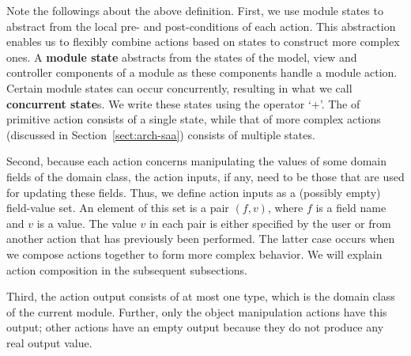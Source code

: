 Note the followings about the above definition. 
First, we use module states to abstract from the local pre- and post-conditions of each action. This abstraction enables us to flexibly combine actions based on states to construct more complex ones. A \textbf{module state} abstracts from the states of the model, view and controller components of a module as these components handle a module action. Certain module states can occur concurrently, resulting in what we call \textbf{concurrent state}s. We write these states using the operator `+'. 
The  of primitive action consists of a single state, while that of more complex actions (discussed in Section~\ref{sect:arch-saa}) consists of multiple states.

Second, because each action concerns manipulating the values of some domain fields of the domain class, the action inputs, if any, need to be those that are used for updating these fields. Thus, we define action inputs as a (possibly empty) field-value set. An element of this set is a pair $(f,v)$, where $f$ is a field name and $v$ is a value. The value $v$ in each pair is either specified by the user or from another action that has previously been performed. The latter case occurs when we compose actions together to form more complex behavior. We will explain action composition in the subsequent subsections.

%
Third, the action output consists of at most one type, which is the domain class of the current module. Further, only the object manipulation actions have this output; other actions have an empty output because they do not produce any real output value.

